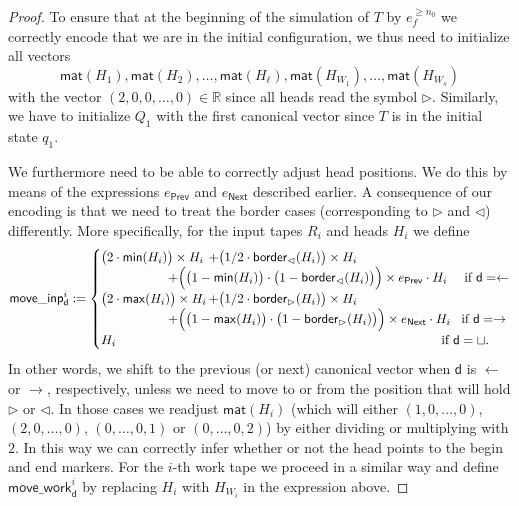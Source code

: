 \begin{proof}
    To ensure that at the beginning of the simulation of $T$ by $e_f^{\geq n_0}$ we correctly encode 
    that we are in the initial configuration, we thus need to initialize all vectors 
    $$\mathsf{mat}(H_1),\mathsf{mat}(H_2),\ldots, \mathsf{mat}(H_\ell), \mathsf{mat}(H_{W_1}),\ldots, \mathsf{mat}(H_{W_s})$$
    with the vector $(2,0,0,\ldots,0)\in\mathbb{R}$ since all heads read the symbol $\rhd$. Similarly, 
    we have to initialize $Q_1$ with the first canonical vector since $T$ is in the initial state $q_1$.

    We furthermore need to be able to correctly adjust head positions. We do this by means of the expressions $e_{\mathsf{Prev}}$ and $e_{\mathsf{Next}}$	described earlier.
    A consequence of our encoding is that we need to treat the border cases (corresponding to $\rhd$ and 
    $\lhd$) differently. More specifically, for the input tapes $R_i$ and heads $H_i$ we define 
    $$
    \mathsf{move\_inp}^i_{\mathsf{d}}:=
    \begin{cases}
    \bigl(2\cdot\mathsf{min}(H_i)\bigr)\times H_i &\!\!\!\!\!+ \bigl(1/2\cdot\mathsf{border}_{\lhd}(H_i)\bigr)\times H_i \\
    & \hspace{-4em}+\Bigl(\bigl(1-\mathsf{min}(H_i)\bigr)\cdot\bigl(1-\mathsf{border}_{\lhd}(H_i)\bigr)\Bigr)\times e_{\mathsf{Prev}}\cdot H_i \quad \text{ if $\mathsf{d}=\leftarrow$}\\
    \bigl(2\cdot \mathsf{max}(H_i)\bigr)\times H_i &\!\!\!\!\! + \bigl(1/2\cdot\mathsf{border}_{\rhd}(H_i)\bigr)\times H_i \\
    & \hspace{-4em}+ \Bigl( \bigl(1-\mathsf{max}(H_i)\bigr) \cdot \bigl(1-\mathsf{border}_{\rhd}(H_i)\bigr) \Bigr)\times e_{\mathsf{Next}}\cdot H_i  \quad\!\text{if $\mathsf{d}=\rightarrow$}\\
    H_i & \hspace{17.5em}\!\text{if $\mathsf{d}=\sqcup$}. 
    \end{cases}
    $$
    In other words, we shift to the previous (or next) canonical vector when $\mathsf{d}$ is $\leftarrow$ 
    or $\rightarrow$, respectively, unless we need to move to or from the position that will hold $\rhd$ 
    or $\lhd$. In those cases we readjust $\mathsf{mat}(H_i)$ (which will either $(1,0,\ldots,0)$, $(2,0,\ldots,0)$, 
    $(0,\ldots,0,1)$ or $(0,\ldots,0,2)$) by either dividing or multiplying with $2$. In this way we can 
    correctly infer whether or not the head points to the begin and end markers. For the $i$-th work tape we 
    proceed in a similar way and define $\mathsf{move\_work}^i_{\mathsf{d}}$ by replacing $H_{i}$ with $H_{W_i}$ in the expression above. 
 

\end{proof}
